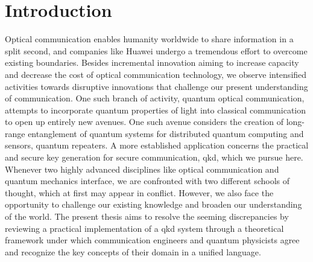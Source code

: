 \chapter*{Introduction}

Optical communication enables humanity worldwide to share information in a split second, and companies like Huawei undergo a tremendous effort to overcome existing boundaries.
Besides incremental innovation aiming to increase capacity and decrease the cost of optical communication technology, we observe intensified activities towards disruptive innovations that challenge our present understanding of communication.
One such branch of activity, quantum optical communication, attempts to incorporate quantum properties of light into classical communication to open up entirely new avenues.
One such avenue considers the creation of long-range entanglement of quantum systems for distributed quantum computing and sensors, quantum repeaters.
A more established application concerns the practical and secure key generation for secure communication, \gls{qkd}, which we pursue here.
Whenever two highly advanced disciplines like optical communication and quantum mechanics interface, we are confronted with two different schools of thought, which at first may appear in conflict.
However, we also face the opportunity to challenge our existing knowledge and broaden our understanding of the world.
The present thesis aims to resolve the seeming discrepancies by reviewing a practical implementation of a \gls{qkd} system through a theoretical framework under which communication engineers and quantum physicists agree and recognize the key concepts of their domain in a unified language.
